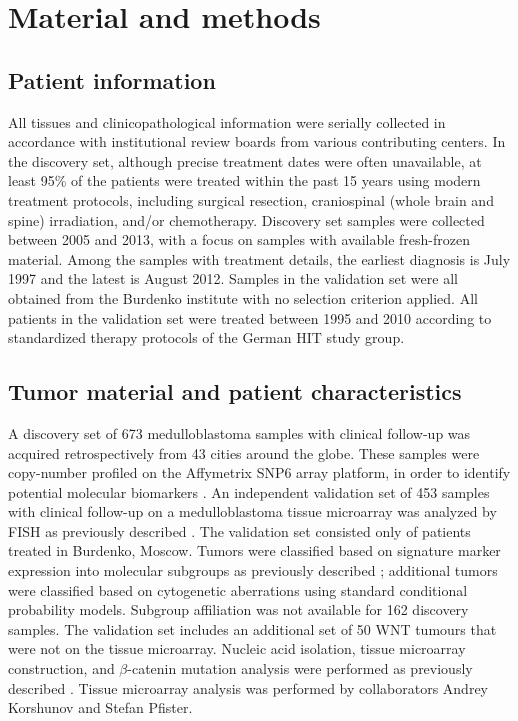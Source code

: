 \clearpage

\section{Material and methods}

\subsection{Patient information}

All tissues and clinicopathological information were serially collected in accordance with institutional review boards from various contributing centers. In the discovery set, although precise treatment dates were often unavailable, at least 95\% of the patients were treated within the past 15 years using modern treatment protocols, including surgical resection, craniospinal (whole brain and spine) irradiation, and/or chemotherapy. Discovery set samples were collected between 2005 and 2013, with a focus on samples with available fresh-frozen material. Among the samples with treatment details, the earliest diagnosis is July 1997 and the latest is August 2012. Samples in the validation set were all obtained from the Burdenko institute with no selection criterion applied. All patients in the validation set were treated between 1995 and 2010 according to standardized therapy protocols of the German HIT study group.

\subsection{Tumor material and patient characteristics}

A discovery set of 673 medulloblastoma samples with clinical follow-up was acquired retrospectively from 43 cities around the globe. These samples were copy-number profiled on the Affymetrix SNP6 array platform, in order to identify potential molecular biomarkers . An independent validation set of 453 samples with clinical follow-up on a medulloblastoma tissue microarray was analyzed by FISH as previously described . The validation set consisted only of patients treated in Burdenko, Moscow. Tumors were classified based on signature marker expression into molecular subgroups as previously described ; additional tumors were classified based on cytogenetic aberrations using standard conditional probability models. Subgroup affiliation was not available for 162 discovery samples. The validation set includes an additional set of 50 WNT tumours that were not on the tissue microarray. Nucleic acid isolation, tissue microarray construction, and $\beta$-catenin mutation analysis were performed as previously described . Tissue microarray analysis was performed by collaborators Andrey Korshunov and Stefan Pfister.

